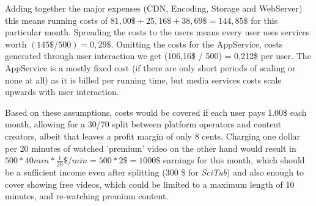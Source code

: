 Adding together the major expenses (CDN, Encoding, Storage and WebServer) this means running costs of 
$ 81,00\$ + 25,16\$ + 38,69\$ = 144,85\$ $ for this particular month. Spreading the costs to the users
means every user uses services worth $(145\$ / 500) = 0,29\$$. Omitting the costs for the AppService, costs generated through user interaction we get (106,16\$ / 500)
= 0,212\$ per user. The AppService is a mostly fixed cost (if there are only short periods of 
scaling or none at all) as it is billed per 
running time, but media services costs scale upwards with user interaction.

Based on these assumptions, costs would be covered if each user pays 1.00\$ each month,
allowing for a 30/70 split between platform operators and content creators, albeit that
leaves a profit margin of only 8 cents. Charging one dollar per 20 minutes of watched 'premium' 
video on the other hand would result in $500 \ast 40 min \ast \frac{1}{20} \$/min = 500 \ast 2\$ = 1000\$$
earnings for this month, which should be a sufficient income even after splitting (300 \$ for \textit{SciTub}) and also enough to cover showing free videos, which could be limited to a maximum length of 10 minutes, and re-watching premium content. 











